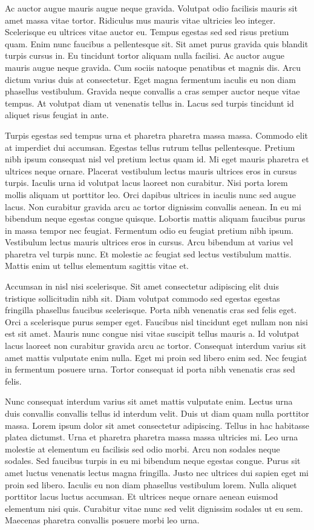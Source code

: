 \documentclass[11pt,a4paper]{article}
\begin{document}
Ac auctor augue mauris augue neque gravida. Volutpat odio facilisis mauris sit amet massa vitae tortor. Ridiculus mus mauris vitae ultricies leo integer. Scelerisque eu ultrices vitae auctor eu. Tempus egestas sed sed risus pretium quam. Enim nunc faucibus a pellentesque sit. Sit amet purus gravida quis blandit turpis cursus in. Eu tincidunt tortor aliquam nulla facilisi. Ac auctor augue mauris augue neque gravida. Cum sociis natoque penatibus et magnis dis. Arcu dictum varius duis at consectetur. Eget magna fermentum iaculis eu non diam phasellus vestibulum. Gravida neque convallis a cras semper auctor neque vitae tempus. At volutpat diam ut venenatis tellus in. Lacus sed turpis tincidunt id aliquet risus feugiat in ante.

Turpis egestas sed tempus urna et pharetra pharetra massa massa. Commodo elit at imperdiet dui accumsan. Egestas tellus rutrum tellus pellentesque. Pretium nibh ipsum consequat nisl vel pretium lectus quam id. Mi eget mauris pharetra et ultrices neque ornare. Placerat vestibulum lectus mauris ultrices eros in cursus turpis. Iaculis urna id volutpat lacus laoreet non curabitur. Nisi porta lorem mollis aliquam ut porttitor leo. Orci dapibus ultrices in iaculis nunc sed augue lacus. Non curabitur gravida arcu ac tortor dignissim convallis aenean. In eu mi bibendum neque egestas congue quisque. Lobortis mattis aliquam faucibus purus in massa tempor nec feugiat. Fermentum odio eu feugiat pretium nibh ipsum. Vestibulum lectus mauris ultrices eros in cursus. Arcu bibendum at varius vel pharetra vel turpis nunc. Et molestie ac feugiat sed lectus vestibulum mattis. Mattis enim ut tellus elementum sagittis vitae et.

Accumsan in nisl nisi scelerisque. Sit amet consectetur adipiscing elit duis tristique sollicitudin nibh sit. Diam volutpat commodo sed egestas egestas fringilla phasellus faucibus scelerisque. Porta nibh venenatis cras sed felis eget. Orci a scelerisque purus semper eget. Faucibus nisl tincidunt eget nullam non nisi est sit amet. Mauris nunc congue nisi vitae suscipit tellus mauris a. Id volutpat lacus laoreet non curabitur gravida arcu ac tortor. Consequat interdum varius sit amet mattis vulputate enim nulla. Eget mi proin sed libero enim sed. Nec feugiat in fermentum posuere urna. Tortor consequat id porta nibh venenatis cras sed felis.

Nunc consequat interdum varius sit amet mattis vulputate enim. Lectus urna duis convallis convallis tellus id interdum velit. Duis ut diam quam nulla porttitor massa. Lorem ipsum dolor sit amet consectetur adipiscing. Tellus in hac habitasse platea dictumst. Urna et pharetra pharetra massa massa ultricies mi. Leo urna molestie at elementum eu facilisis sed odio morbi. Arcu non sodales neque sodales. Sed faucibus turpis in eu mi bibendum neque egestas congue. Purus sit amet luctus venenatis lectus magna fringilla. Justo nec ultrices dui sapien eget mi proin sed libero. Iaculis eu non diam phasellus vestibulum lorem. Nulla aliquet porttitor lacus luctus accumsan. Et ultrices neque ornare aenean euismod elementum nisi quis. Curabitur vitae nunc sed velit dignissim sodales ut eu sem. Maecenas pharetra convallis posuere morbi leo urna.
\end{document}

